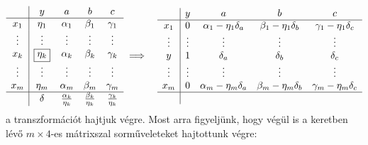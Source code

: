 \documentclass[9pt, a4paper, showtrims]{memoir}
\theoremstyle{plain}
\theoremstyle{remark}
\theoremstyle{definition}
\begin{document}
\begin{eqnarray*}
	\begin{array}{c|cccc}
		       & y              & a                       & b                      & c                       \\
		\hline
		x_1    & \eta_1         & \alpha_1                & \beta_1                & \gamma_1                \\
		\vdots & \vdots         & \vdots                  & \vdots                 & \vdots                  \\
		x_k    & \boxed{\eta_k} & \alpha_k                & \beta_k                & \gamma_k                \\
		\vdots & \vdots         & \vdots                  & \vdots                 & \vdots                  \\
		x_m    & \eta_m         & \alpha_m                & \beta_m                & \gamma_m                \\
		\hline
		       & \delta         & \frac{\alpha_k}{\eta_k} & \frac{\beta_k}{\eta_k} & \frac{\gamma_k}{\eta_k} \\
	\end{array}
	&\implies&
	\begin{array}{c|cccc}
		       & y      & a                       & b                      & c                       \\
		\hline
		x_1    & 0      & \alpha_1-\eta_1\delta_a & \beta_1-\eta_1\delta_b & \gamma_1-\eta_1\delta_c \\
		\vdots & \vdots & \vdots                  & \vdots                 & \vdots                  \\
		y      & 1      & \delta_a                & \delta_b               & \delta_c                \\
		\vdots & \vdots & \vdots                  & \vdots                 & \vdots                  \\
		x_m    & 0      & \alpha_m-\eta_m\delta_a & \beta_m-\eta_m\delta_b & \gamma_m-\eta_m\delta_c \\
		\hline
		       &        &
	\end{array}
\end{eqnarray*}
a transzformációt hajtjuk végre.
Most arra figyeljünk,
hogy végül is a keretben lévő $m\times 4$-es mátrixszal sorműveleteket hajtottunk végre:
\end{document}
